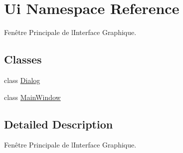 \hypertarget{namespaceUi}{}\section{Ui Namespace Reference}
\label{namespaceUi}


Fen\^{e}tre Principale de l\textquotesingle{}Interface Graphique.  


\subsection*{Classes}
\begin{DoxyCompactItemize}
\item 
class \hyperlink{classUi_1_1Dialog}{Dialog}
\item 
class \hyperlink{classUi_1_1MainWindow}{Main\+Window}
\end{DoxyCompactItemize}


\subsection{Detailed Description}
Fen\^{e}tre Principale de l\textquotesingle{}Interface Graphique. 